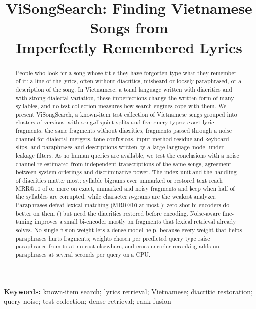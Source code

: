 \documentclass[11pt]{article}
\title{ViSongSearch: Finding Vietnamese Songs from\\ Imperfectly Remembered Lyrics}
\author{\authornote{names, FPT University, Vietnam; corresponding e-mail}}
\date{}
\makeatletter
\newcommand{\mrr}{MRR@10\xspace}
\makeatother
\begin{document}
\maketitle

\begin{abstract}
People who look for a song whose title they have forgotten type what they remember of it: a line of the
lyrics, often without diacritics, misheard or loosely paraphrased, or a description of the song. In
Vietnamese, a tonal language written with diacritics and with strong dialectal variation, these
imperfections change the written form of many syllables, and no test collection measures how search engines
cope with them. We present ViSongSearch, a known-item test collection of \NSongs{} Vietnamese songs grouped
into clusters of versions, with song-disjoint splits and five query types: exact lyric fragments, the same
fragments without diacritics, fragments passed through a noise channel for dialectal mergers, tone
confusions, input-method residue and keyboard slips, and paraphrases and descriptions written by a large
language model under leakage filters. As no human queries are available, we test the conclusions with a
noise channel re-estimated from independent transcriptions of the same songs, agreement between system
orderings and discriminative power. The index unit and the handling of diacritics matter most: syllable
bigrams over unmarked or restored text reach \mrr{} of \MNodiacBiThree{} or more on exact, unmarked and noisy
fragments and keep \MNodiacBiNFifty{} when half of the syllables are corrupted, while character $n$-grams are
the weakest analyzer. Paraphrases defeat lexical matching (\mrr{} at most \BestLexQfour); zero-shot
bi-encoders do better on them (\MDenseEbaseFour) but need the diacritics restored before encoding.
Noise-aware fine-tuning improves a small bi-encoder mostly on fragments that lexical retrieval already
solves. No single fusion weight lets a dense model help, because every weight that helps paraphrases hurts
fragments; weights chosen per predicted query type raise paraphrases from \MFuseGlobalFour{} to
\MHybNaftAdaptiveFour{} at no cost elsewhere, and cross-encoder reranking adds \PlRerankFour{} on paraphrases at
several seconds per query on a CPU.
\end{abstract}

\noindent\textbf{Keywords:} known-item search; lyrics retrieval; Vietnamese; diacritic restoration;
query noise; test collection; dense retrieval; rank fusion

\end{document}
